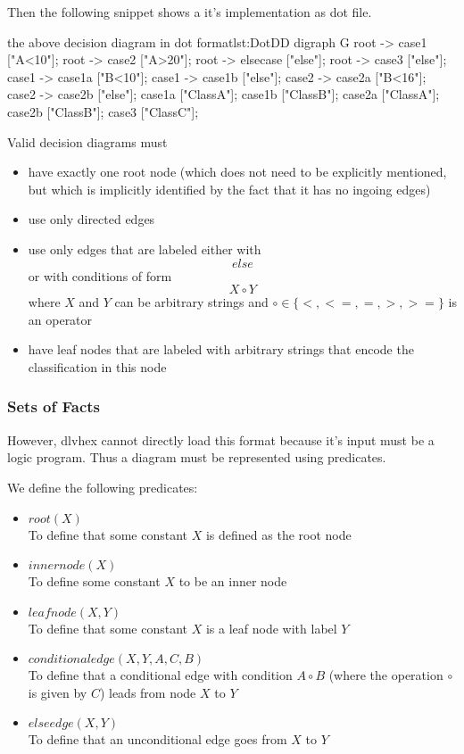 \documentclass[a4paper,11pt]{article}
\theoremstyle{definition}
\newcommand{\dlvhex}{\textsf{dlvhex}\xspace }
\newcommand{\dotff}{\textsf{dot}\xspace }
\begin{document}
				\noindent Then the following snippet shows a it's implementation as \dotff file.

				\begin{program}[dot]{the above decision diagram in \dotff format}{lst:DotDD}
	digraph G {
		root -> case1 ["A<10"];
		root -> case2 ["A>20"];
		root -> elsecase ["else"];
		root -> case3 ["else"];
		case1 -> case1a ["B<10"];
		case1 -> case1b ["else"];
		case2 -> case2a ["B<16"];
		case2 -> case2b ["else"];
		case1a ["ClassA"];
		case1b ["ClassB"];
		case2a ["ClassA"];
		case2b ["ClassB"];
		case3 ["ClassC"];
	}
				\end{program}

				Valid decision diagrams must
				\begin{itemize}
					\item have exactly one root node (which does not need to be explicitly mentioned, but which is implicitly identified by the fact that it has no ingoing edges)
					\item use only directed edges
					\item use only edges that are labeled either with
							$$\mathit{else}$$
						or with conditions of form
							$$X \circ Y$$
						where $X$ and $Y$ can be arbitrary strings and $\circ \in \{ <, <=, =, >, >= \}$ is an operator
					\item have leaf nodes that are labeled with arbitrary strings that encode the classification in this node
				\end{itemize}


			\subsubsection{Sets of Facts}

				However, \dlvhex cannot directly load this format because it's input must be a logic program. Thus a diagram must be represented using predicates.
				
				We define the following predicates:
				\begin{itemize}
					\item $\textit{root}(X)$ \\
						To define that some constant $X$ is defined as the root node
					\item $\textit{innernode}(X)$ \\
						To define some constant $X$ to be an inner node
					\item $\textit{leafnode}(X, Y)$ \\
						To define that some constant $X$ is a leaf node with label $Y$
					\item $\textit{conditionaledge}(X, Y, A, C, B)$ \\
						To define that a conditional edge with condition $A \circ B$ (where the operation $\circ$ is given by $C$) leads from node $X$ to $Y$
					\item $\textit{elseedge}(X, Y)$ \\
						To define that an unconditional edge goes from $X$ to $Y$
				\end{itemize}
				
\end{document}

